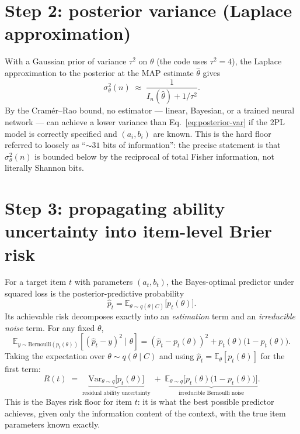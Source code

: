 \documentclass[11pt]{article}
\begin{document}
\section{Step 2: posterior variance (Laplace approximation)}

With a Gaussian prior of variance $\tau^2$ on $\theta$ (the code uses
$\tau^2 = 4$), the Laplace approximation to the posterior at the MAP
estimate $\hat\theta$ gives
\begin{equation}
  \sigma_\theta^2(n) \;\approx\; \frac{1}{I_n(\hat\theta) + 1/\tau^2}.
  \label{eq:posterior-var}
\end{equation}
By the Cram\'er--Rao bound, no estimator --- linear, Bayesian, or a trained
neural network --- can achieve a lower variance than
Eq.~\eqref{eq:posterior-var} if the 2PL model is correctly specified and
$(a_i, b_i)$ are known. This is the hard floor referred to loosely as
``$\sim 31$ bits of information'': the precise statement is that
$\sigma_\theta^2(n)$ is bounded below by the reciprocal of total Fisher
information, not literally Shannon bits.

\section{Step 3: propagating ability uncertainty into item-level Brier risk}

For a target item $t$ with parameters $(a_t, b_t)$, the Bayes-optimal
predictor under squared loss is the posterior-predictive probability
\begin{equation}
  \hat p_t = \mathbb{E}_{\theta \sim q(\theta \mid C)}\big[p_t(\theta)\big].
\end{equation}
Its achievable risk decomposes exactly into an \emph{estimation} term and an
\emph{irreducible noise} term. For any fixed $\theta$,
\begin{equation}
  \mathbb{E}_{y \sim \mathrm{Bernoulli}(p_t(\theta))}\!\left[(\hat p_t - y)^2 \mid \theta\right]
  = (\hat p_t - p_t(\theta))^2 + p_t(\theta)\big(1 - p_t(\theta)\big).
\end{equation}
Taking the expectation over $\theta \sim q(\theta \mid C)$ and using
$\hat p_t = \mathbb{E}_\theta[p_t(\theta)]$ for the first term:
\begin{equation}
  R(t) \;=\; \underbrace{\mathrm{Var}_{\theta \sim q}\big[p_t(\theta)\big]}_{\text{residual ability uncertainty}}
  \;+\; \underbrace{\mathbb{E}_{\theta \sim q}\big[p_t(\theta)\big(1 - p_t(\theta)\big)\big]}_{\text{irreducible Bernoulli noise}}.
  \label{eq:risk-decomp}
\end{equation}
This is the Bayes risk floor for item $t$: it is what the best possible
predictor achieves, given only the information content of the context, with
the true item parameters known exactly.
\end{document}
